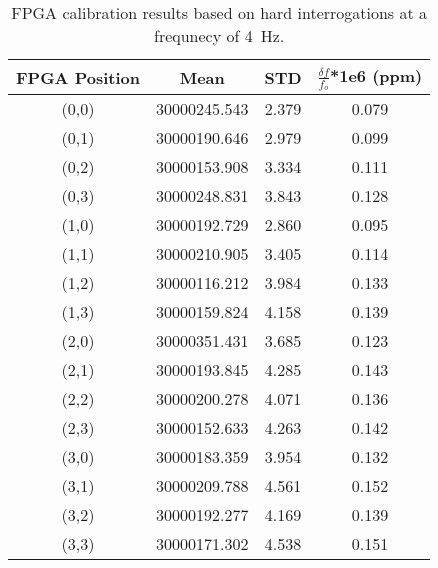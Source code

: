 \begin{table}
	\begin{center}
		\begin{tabular}{|c|c|c|c|}
			\hline
			FPGA Position & Mean & STD & $\frac{\delta f}{f_{o}}$*1e6 (ppm) \\
			\hline
			(0,0) & 30000245.543 & 2.379 & 0.079 \\
			\hline
			(0,1) & 30000190.646 & 2.979 & 0.099 \\
			\hline
			(0,2) & 30000153.908 & 3.334 & 0.111 \\
			\hline
			(0,3) & 30000248.831 & 3.843 & 0.128 \\
			\hline
			(1,0) & 30000192.729 & 2.860 & 0.095 \\
			\hline
			(1,1) & 30000210.905 & 3.405 & 0.114 \\
			\hline
			(1,2) & 30000116.212 & 3.984 & 0.133 \\
			\hline
			(1,3) & 30000159.824 & 4.158 & 0.139 \\
			\hline
			(2,0) & 30000351.431 & 3.685 & 0.123 \\
			\hline
			(2,1) & 30000193.845 & 4.285 & 0.143 \\
			\hline
			(2,2) & 30000200.278 & 4.071 & 0.136 \\
			\hline
			(2,3) & 30000152.633 & 4.263 & 0.142 \\
			\hline
			(3,0) & 30000183.359 & 3.954 & 0.132 \\
			\hline
			(3,1) & 30000209.788 & 4.561 & 0.152 \\
			\hline
			(3,2) & 30000192.277 & 4.169 & 0.139 \\
			\hline
			(3,3) & 30000171.302 & 4.538 & 0.151 \\
			\hline
		\end{tabular}
	\end{center}
	\caption{FPGA calibration results based on hard interrogations at a frequnecy of 4~\unit{Hz}.}
	\label{tab:fpga_calibration}
\end{table}